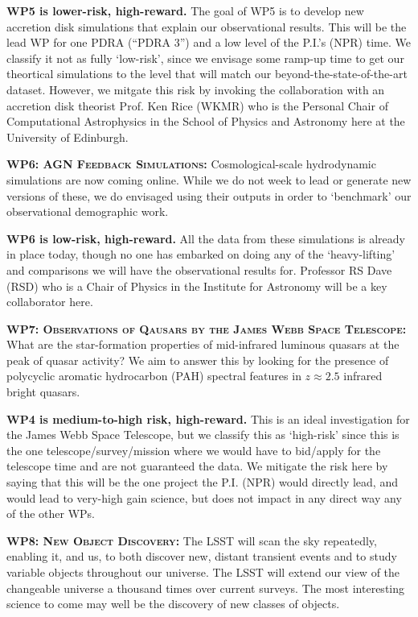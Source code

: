 \documentclass[oneside, a4paper, onecolumn, 11pt]{article}
\begin{document}
\noindent
{\bf WP5 is lower-risk, high-reward.}
The goal of WP5 is to develop new accretion disk simulations that
explain our observational results.  This will be the lead WP for one
PDRA (``PDRA 3'') and a low level of the P.I.'s (NPR) time. We
classify it not as fully `low-risk', since we envisage some ramp-up
time to get our theortical simulations to the level that will match
our beyond-the-state-of-the-art dataset. However, we mitgate this risk
by invoking the collaboration with an accretion disk theorist
Prof. Ken Rice (WKMR) who is the Personal Chair of Computational
Astrophysics in the School of Physics and Astronomy here at the
University of Edinburgh.


\smallskip
\smallskip
\noindent
\textbf{\textsc{WP6: AGN Feedback Simulations:}} 
Cosmological-scale hydrodynamic simulations are now coming online. 
While we do not week to lead or generate new versions of these, we do 
envisaged using their outputs in order to `benchmark' our observational 
demographic work. 

\noindent
{\bf WP6 is low-risk, high-reward.}
All the data from these simulations is already in place today, though no one 
has embarked on doing any of the `heavy-lifting' and comparisons we will 
have the observational results for. Professor RS Dave (RSD) who is a Chair of Physics 
in the Institute for Astronomy will be a key collaborator here. 


\smallskip
\smallskip
\noindent
\textbf{\textsc{WP7: Observations of Qausars by the James Webb Space Telescope:}} 
What are the star-formation properties of mid-infrared luminous quasars at the peak of quasar activity? 
We aim to answer this by looking for the presence of polycyclic aromatic hydrocarbon (PAH) spectral features 
in $z \approx 2.5$ infrared bright quasars. 

\noindent
{\bf WP4 is medium-to-high risk, high-reward.}
This is an ideal investigation for the James Webb Space Telescope, but we classify this as `high-risk' since this is the one telescope/survey/mission where we would have to bid/apply for the telescope time and are not guaranteed the data. We mitigate the risk here by saying that this will be the one project the P.I. (NPR) would directly lead, and would lead to very-high gain science, but does not impact in any direct way any of the other WPs. 


\smallskip
\smallskip
\noindent
\textbf{\textsc{WP8: New Object Discovery:}} 
The LSST will scan the sky repeatedly, enabling it, and us, to both
discover new, distant transient events and to study variable objects
throughout our universe. The LSST will extend our view of the
changeable universe a thousand times over current surveys.  The most
interesting science to come may well be the discovery of new classes
of objects.
\end{document}

